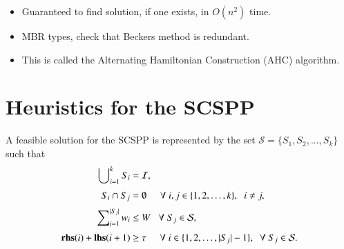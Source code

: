 \documentclass{elsarticle}
\begin{document}
{\begin{itemize}[leftmargin=*]
	\item Guaranteed to find solution, if one exists, in $O(n^2)$ time.
	\item MBR types, check that Beckers method is redundant.
	\item This is called the Alternating Hamiltonian Construction (AHC) algorithm.
\end{itemize}
}


\section{Heuristics for the SCSPP}
\label{sec:scspp}
A feasible solution for the SCSPP is represented by the set $\mathcal{S} = \{S_1, S_2, ..., S_k\}$ such that
\begin{subequations}
	\begin{align}
	\bigcup\nolimits_{i=1}^{k} S_i &= \mathcal{I}, \label{eqn:packall}\\[3pt]
	S_i \cap S_j &= \emptyset \hspace{5mm} \forall \hspace{1mm} i, j \in \{1,2,\dotsc,k\}, \hspace{2mm} i \neq j, \label{eqn:nooverlap} \\[3pt]
	\sum\nolimits_{i=1}^{|S_j|}w_i & \leq W \hspace{3mm} \forall \hspace{1mm} S_j \in \mathcal{S}, \label{eqn:capacity} \\[3pt]
	\textup{\textbf{rhs}}(i) + \textup{\textbf{lhs}}(i+1) &\geq \tau \hspace {5mm} \forall \hspace{1mm} i \in \{1, 2,\dotsc,|S_j|-1\}, \hspace{2mm} \forall \hspace{1mm} S_j \in \mathcal{S}. \label{eqn:vscstrip}
	\end{align}
\end{subequations}
\end{document}
